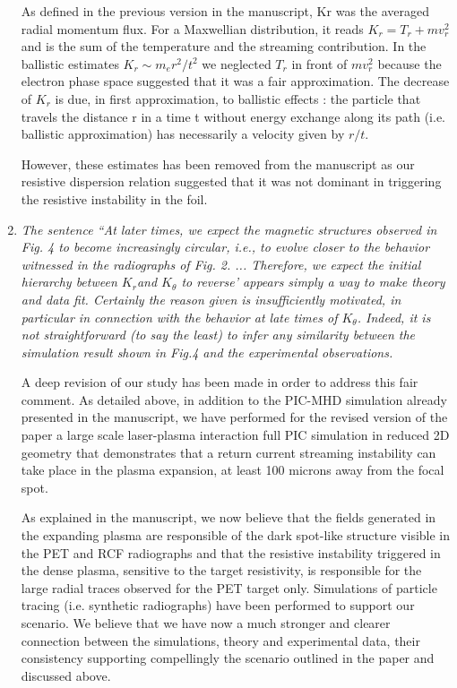 \documentclass{article}
\begin{document}
\begin{enumerate}
As defined in the previous version in the manuscript, Kr was the averaged radial momentum flux. For a Maxwellian distribution, it reads $K_r = T_r +m v_r^2$ and is  the sum of the temperature and the streaming contribution.
In the ballistic estimates $K_r  \sim m_e r^2/t^2$ we neglected  $T_r$ in front of $m v_r^2$ because the electron phase space suggested that it was a fair approximation. The decrease of $K_r$ is due, in first approximation, to ballistic effects : the particle that travels the distance r in a time t without energy exchange along its path (i.e. ballistic approximation) has necessarily a velocity given by $r/t$. 

However, these estimates has been removed from the manuscript as our resistive dispersion relation suggested that it was not dominant in triggering the resistive instability in the foil.

\item \textit{The sentence ``At later times, we expect the magnetic structures observed in Fig. 4 to become increasingly circular, i.e., to evolve closer to the behavior witnessed in the radiographs of Fig. 2. ... Therefore, we expect the initial hierarchy between $K_r $and $K_\theta$ to reverse' appears simply a way to make theory and data fit. Certainly the reason given is insufficiently motivated, in particular in connection with the behavior at late times of $K_\theta$. Indeed, it is not straightforward (to say the least) to infer any similarity between the simulation result shown in Fig.4 and the experimental observations. }

A deep revision of our study has been made in order to address this fair comment. As detailed above, in addition to the PIC-MHD simulation already presented in the manuscript, we have performed for the revised version of the paper a large scale laser-plasma interaction full PIC simulation in reduced 2D geometry that demonstrates that a return current streaming instability can take place in the plasma expansion, at least 100 microns away from the focal spot.

As explained in the manuscript, we now believe that the fields generated in the expanding plasma are responsible of the dark spot-like structure visible in the PET and RCF radiographs and that the resistive instability triggered in the dense plasma, sensitive to the target resistivity, is responsible for the large radial traces observed for the PET target only. Simulations of particle tracing (i.e. synthetic radiographs) have been performed to support our scenario. We believe that we have now a much stronger and clearer connection between the simulations, theory and experimental data, their consistency supporting compellingly the scenario outlined in the paper and discussed above.


\end{enumerate}
\end{document}
